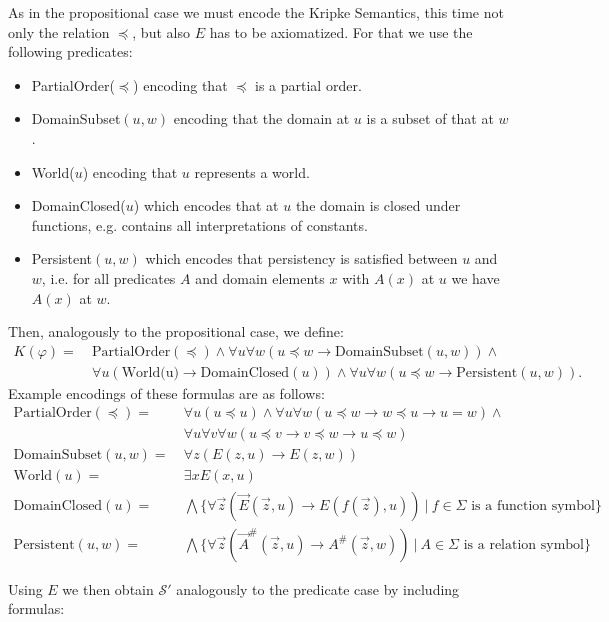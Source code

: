 \documentclass[runningheads]{llncs}
\begin{document}
As in the propositional case we must encode the Kripke Semantics, this time not only the relation $\preceq$, but also $E$ has to be axiomatized. For that we use the following predicates:
\begin{itemize}
	\item PartialOrder($\preceq$) encoding that $\preceq$ is a partial order.
	\item DomainSubset$(u, w)$ encoding that the domain at $u$ is a subset of that at $w$.
	\item World($u$) encoding that $u$ represents a world.
	\item DomainClosed($u$) which encodes that at $u$ the domain is closed under functions, e.g. contains all interpretations of constants.
	\item Persistent$(u, w)$ which encodes that persistency is satisfied between $u$ and $w$, i.e. for all predicates $A$ and domain elements $x$ with $A(x)$ at $u$ we have $A(x)$ at $w$.
\end{itemize}
Then, analogously to the propositional case, we define:
\begin{align*}
	K(\varphi) = \:& \text{PartialOrder}(\preceq) \wedge \forall u \forall w (u\preceq w\to \text{DomainSubset}(u, w)) \wedge\\
				 & \forall u(\text{World(u)}\to \text{DomainClosed}(u))\wedge \forall u\forall w (u\preceq w\to \text{Persistent}(u, w)).
\end{align*}
Example encodings of these formulas are as follows:
\begin{align*}
	\text{PartialOrder}(\preceq) = &\:\forall u(u\preceq u)\wedge\forall u\forall w(u\preceq w\to w\preceq u\to u = w)\wedge\\&\:\forall u\forall v\forall w(u\preceq v\to v\preceq w\to u\preceq w)\\
	\text{DomainSubset}(u, w) = &\:\forall z(E(z, u)\to E(z, w))\\
	\text{World}(u) = &\:\exists xE(x, u)\\
	\text{DomainClosed}(u) = &\:\bigwedge\{\forall\vec z(\vec E(\vec z, u)\to E(f(\vec z), u))\:|\:\text{$f\in\Sigma$ is a function symbol}\}\\
	\text{Persistent}(u, w) = &\:\bigwedge\{\forall\vec z(\vec A^\#(\vec z, u)\to A^\#(\vec z, w))\:|\:\text{$A\in\Sigma$ is a relation symbol}\}
\end{align*}

Using $E$ we then obtain $\mathcal S'$ analogously to the predicate case by including formulas:
\end{document}
